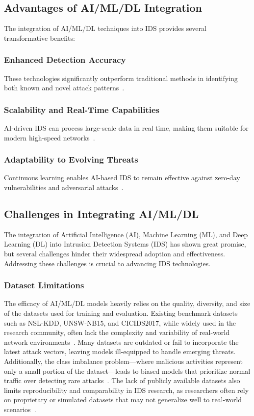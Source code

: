 \subsection{Advantages of AI/ML/DL Integration}
The integration of AI/ML/DL techniques into IDS provides several transformative benefits:

\subsubsection{Enhanced Detection Accuracy} These technologies significantly outperform traditional methods in identifying both known and novel attack patterns~\cite{Jayalaxmi2022}.

\subsubsection{Scalability and Real-Time Capabilities} AI-driven IDS can process large-scale data in real time, making them suitable for modern high-speed networks~\cite{Gutierrez2023}.

\subsubsection{Adaptability to Evolving Threats} Continuous learning enables AI-based IDS to remain effective against zero-day vulnerabilities and adversarial attacks~\cite{vinayakumar2019deep}.

\subsection{Challenges in Integrating AI/ML/DL}
The integration of Artificial Intelligence (AI), Machine Learning (ML), and Deep Learning (DL) into Intrusion Detection Systems (IDS) has shown great promise, but several challenges hinder their widespread adoption and effectiveness. Addressing these challenges is crucial to advancing IDS technologies.

\subsubsection{Dataset Limitations} The efficacy of AI/ML/DL models heavily relies on the quality, diversity, and size of the datasets used for training and evaluation. Existing benchmark datasets such as NSL-KDD, UNSW-NB15, and CICIDS2017, while widely used in the research community, often lack the complexity and variability of real-world network environments~\cite{Sadia2024}. Many datasets are outdated or fail to incorporate the latest attack vectors, leaving models ill-equipped to handle emerging threats. Additionally, the class imbalance problem—where malicious activities represent only a small portion of the dataset—leads to biased models that prioritize normal traffic over detecting rare attacks~\cite{Jayalaxmi2022}. The lack of publicly available datasets also limits reproducibility and comparability in IDS research, as researchers often rely on proprietary or simulated datasets that may not generalize well to real-world scenarios~\cite{Gutierrez2023}.

